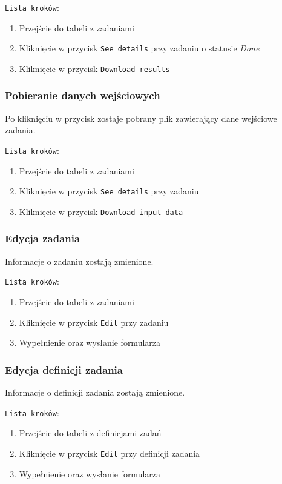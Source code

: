 \documentclass[a4paper,11pt,twoside]{report}
\theoremstyle{definition}
\begin{document}
				\texttt{Lista kroków}:
				\begin{enumerate}
					\item Przejście do tabeli z zadaniami
					\item Kliknięcie w przycisk \texttt{See details} przy zadaniu o statusie \textit{Done}
					\item Kliknięcie w przycisk \texttt{Download results}
				\end{enumerate}

    		\subsubsection{Pobieranie danych wejściowych}	
				Po kliknięciu w przycisk zostaje pobrany plik zawierający dane wejściowe zadania.
				
				\texttt{Lista kroków}:
				\begin{enumerate}
					\item Przejście do tabeli z zadaniami
					\item Kliknięcie w przycisk \texttt{See details} przy zadaniu
					\item Kliknięcie w przycisk \texttt{Download input data}
				\end{enumerate}

    		\subsubsection{Edycja zadania}	
				Informacje o zadaniu zostają zmienione.
				
				\texttt{Lista kroków}:
				\begin{enumerate}
					\item Przejście do tabeli z zadaniami
					\item Kliknięcie w przycisk \texttt{Edit} przy zadaniu
					\item Wypełnienie oraz wysłanie formularza
				\end{enumerate}

    		\subsubsection{Edycja definicji zadania}	
				Informacje o definicji zadania zostają zmienione.
				
				\texttt{Lista kroków}:
				\begin{enumerate}
					\item Przejście do tabeli z definicjami zadań
					\item Kliknięcie w przycisk \texttt{Edit} przy definicji zadania
					\item Wypełnienie oraz wysłanie formularza
				\end{enumerate}
\end{document}
